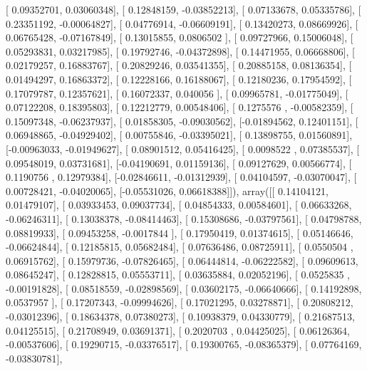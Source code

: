 \documentclass{article}
\begin{document}
       [ 0.09352701,  0.03060348],
       [ 0.12848159, -0.03852213],
       [ 0.07133678,  0.05335786],
       [ 0.23351192, -0.00064827],
       [ 0.04776914, -0.06609191],
       [ 0.13420273,  0.08669926],
       [ 0.06765428, -0.07167849],
       [ 0.13015855,  0.0806502 ],
       [ 0.09727966,  0.15006048],
       [ 0.05293831,  0.03217985],
       [ 0.19792746, -0.04372898],
       [ 0.14471955,  0.06668806],
       [ 0.02179257,  0.16883767],
       [ 0.20829246,  0.03541355],
       [ 0.20885158,  0.08136354],
       [ 0.01494297,  0.16863372],
       [ 0.12228166,  0.16188067],
       [ 0.12180236,  0.17954592],
       [ 0.17079787,  0.12357621],
       [ 0.16072337,  0.040056  ],
       [ 0.09965781, -0.01775049],
       [ 0.07122208,  0.18395803],
       [ 0.12212779,  0.00548406],
       [ 0.1275576 , -0.00582359],
       [ 0.15097348, -0.06237937],
       [ 0.01858305, -0.09030562],
       [-0.01894562,  0.12401151],
       [ 0.06948865, -0.04929402],
       [ 0.00755846, -0.03395021],
       [ 0.13898755,  0.01560891],
       [-0.00963033, -0.01949627],
       [ 0.08901512,  0.05416425],
       [ 0.0098522 ,  0.07385537],
       [ 0.09548019,  0.03731681],
       [-0.04190691,  0.01159136],
       [ 0.09127629,  0.00566774],
       [ 0.1190756 ,  0.12979384],
       [-0.02846611, -0.01312939],
       [ 0.04104597, -0.03070047],
       [ 0.00728421, -0.04020065],
       [-0.05531026,  0.06618388]]), array([[ 0.14104121,  0.01479107],
       [ 0.03933453,  0.09037734],
       [ 0.04854333,  0.00584601],
       [ 0.06633268, -0.06246311],
       [ 0.13038378, -0.08414463],
       [ 0.15308686, -0.03797561],
       [ 0.04798788,  0.08819933],
       [ 0.09453258, -0.0017844 ],
       [ 0.17950419,  0.01374615],
       [ 0.05146646, -0.06624844],
       [ 0.12185815,  0.05682484],
       [ 0.07636486,  0.08725911],
       [ 0.0550504 ,  0.06915762],
       [ 0.15979736, -0.07826465],
       [ 0.06444814, -0.06222582],
       [ 0.09609613,  0.08645247],
       [ 0.12828815,  0.05553711],
       [ 0.03635884,  0.02052196],
       [ 0.0525835 , -0.00191828],
       [ 0.08518559, -0.02898569],
       [ 0.03602175, -0.06640666],
       [ 0.14192898,  0.0537957 ],
       [ 0.17207343, -0.09994626],
       [ 0.17021295,  0.03278871],
       [ 0.20808212, -0.03012396],
       [ 0.18634378,  0.07380273],
       [ 0.10938379,  0.04330779],
       [ 0.21687513,  0.04125515],
       [ 0.21708949,  0.03691371],
       [ 0.2020703 ,  0.04425025],
       [ 0.06126364, -0.00537606],
       [ 0.19290715, -0.03376517],
       [ 0.19300765, -0.08365379],
       [ 0.07764169, -0.03830781],
\end{document}
